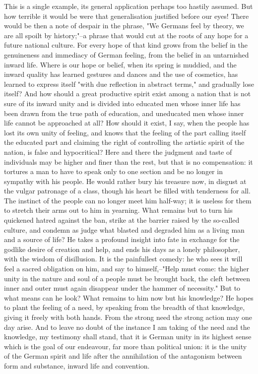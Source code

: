This is a single example, its general application perhaps too hastily
assumed. But how terrible it would be were that generalisation
justified before our eyes! There would be then a note of despair in
the phrase, "We Germans feel by theory, we are all spoilt by
history;"--a phrase that would cut at the roots of any hope for a
future national culture. For every hope of that kind grows from the
belief in the genuineness and immediacy of German feeling, from the
belief in an untarnished inward life. Where is our hope or belief,
when its spring is muddied, and the inward quality has learned
gestures and dances and the use of cosmetics, has learned to express
itself "with due reflection in abstract terms," and gradually lose
itself? And how should a great productive spirit exist among a nation
that is not sure of its inward unity and is divided into educated men
whose inner life has been drawn from the true path of education, and
uneducated men whose inner life cannot be approached at all? How
should it exist, I say, when the people has lost its own unity of
feeling, and knows that the feeling of the part calling itself the
educated part and claiming the right of controlling the artistic
spirit of the nation, is false and hypocritical? Here and there the
judgment and taste of individuals may be higher and finer than the
rest, but that is no compensation: it tortures a man to have to speak
only to one section and be no longer in sympathy with his people. He
would rather bury his treasure now, in disgust at the vulgar
patronage of a class, though his heart be filled with tenderness for
all. The instinct of the people can no longer meet him half-way; it
is useless for them to stretch their arms out to him in yearning.
What remains but to turn his quickened hatred against the ban, strike
at the barrier raised by the so-called culture, and condemn as judge
what blasted and degraded him as a living man and a source of life?
He takes a profound insight into fate in exchange for the godlike
desire of creation and help, and ends his days as a lonely
philosopher, with the wisdom of disillusion. It is the painfullest
comedy: he who sees it will feel a sacred obligation on him, and say
to himself,--"Help must come: the higher unity in the nature and soul
of a people must be brought back, the cleft between inner and outer
must again disappear under the hammer of necessity." But to what
means can he look? What remains to him now but his knowledge? He
hopes to plant the feeling of a need, by speaking from the breadth of
that knowledge, giving it freely with both hands. From the strong
need the strong action may one day arise. And to leave no doubt of
the instance I am taking of the need and the knowledge, my testimony
shall stand, that it is German unity in its highest sense which is
the goal of our endeavour, far more than political union: it is the
unity of the German spirit and life after the annihilation of the
antagonism between form and substance, inward life and convention.


